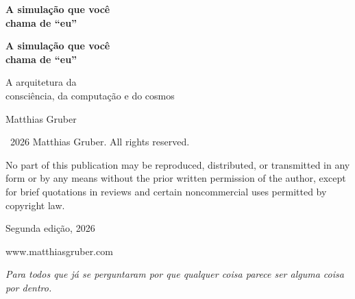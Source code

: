 \documentclass[11pt, twoside, openright]{book}
\makeatletter
\def\cleardoublepage{\clearpage\if@twoside \ifodd\c@page\else
  \thispagestyle{empty}\hbox{}\newpage
  \if@twocolumn\hbox{}\newpage\fi\fi\fi}
\makeatother
\begin{document}
\frontmatter
\pagestyle{empty}

\vspace*{3in}
\begin{center}
{\Huge\bfseries A simulação que você\\[0.3cm] chama de ``eu''\par}
\end{center}
\cleardoublepage

\vspace*{2in}
\begin{center}
{\Huge\bfseries A simulação que você\\[0.3cm] chama de ``eu''\par}
\vspace{0.8cm}
{\Large A arquitetura da\\[0.2cm] consciência, da computação e do cosmos\par}
\vspace{2cm}
{\large Matthias Gruber\par}
\end{center}
\clearpage

\thispagestyle{empty}
\vspace*{\fill}
{\small
\noindent \textcopyright\ 2026 Matthias Gruber. All rights reserved.\par
\vspace{0.5cm}
\noindent No part of this publication may be reproduced, distributed, or transmitted
in any form or by any means without the prior written permission of the author,
except for brief quotations in reviews and certain noncommercial uses
permitted by copyright law.\par
\vspace{0.5cm}

\vspace{0.5cm}
\noindent Segunda edição, 2026\par
\vspace{0.5cm}
\noindent www.matthiasgruber.com\par
}
\cleardoublepage

\thispagestyle{empty}
\vspace*{3in}
\begin{center}
\textit{Para todos que já se perguntaram por que qualquer coisa parece ser alguma coisa por dentro.}
\end{center}
\cleardoublepage
\end{document}
